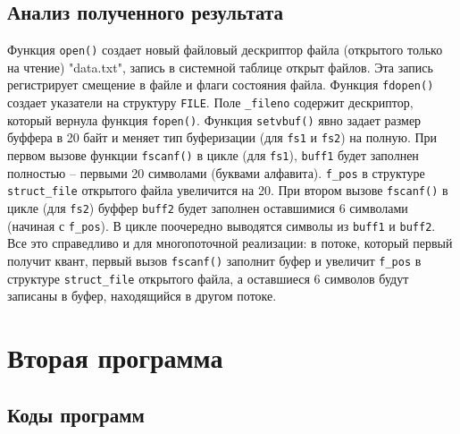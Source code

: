\clearpage
\section{Анализ полученного результата}
Функция \texttt{open()} создает новый файловый дескриптор файла (открытого только на чтение) "data.txt"{}, запись в системной таблице открыт файлов. Эта запись регистрирует смещение в файле и флаги состояния файла.
Функция \texttt{fdopen()} создает указатели на структуру \texttt{FILE}. Поле \texttt{\_fileno} содержит дескриптор, который вернула функция \texttt{fopen()}.
Функция \texttt{setvbuf()} явно задает размер буффера в 20 байт и меняет тип буферизации (для \texttt{fs1} и \texttt{fs2}) на полную.
При первом вызове функции \texttt{fscanf()} в цикле (для \texttt{fs1}), \texttt{buff1} будет заполнен полностью -- первыми 20 символами (буквами алфавита). \texttt{f\_pos} в структуре \texttt{struct\_file} открытого файла увеличится на 20.
При втором вызове \texttt{fscanf()} в цикле (для \texttt{fs2}) буффер \texttt{buff2} будет заполнен оставшимися 6 символами (начиная с \texttt{f\_pos}).
В цикле поочередно выводятся символы из \texttt{buff1} и \texttt{buff2}.
Все это справедливо и для многопоточной реализации: в потоке, который первый получит квант, первый вызов \texttt{fscanf()} заполнит буфер и увеличит \texttt{f\_pos} в структуре \texttt{struct\_file} открытого файла, а оставшиеся 6 символов будут записаны в буфер, находящийся в другом потоке.

\clearpage

\chapter{Вторая программа}

\section{Коды программ}



\clearpage



